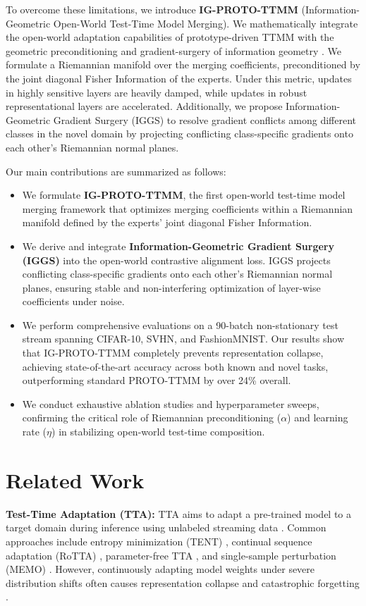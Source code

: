 \documentclass{article}
\theoremstyle{plain}
\theoremstyle{definition}
\theoremstyle{remark}
\begin{document}
To overcome these limitations, we introduce \textbf{IG-PROTO-TTMM} (Information-Geometric Open-World Test-Time Model Merging). We mathematically integrate the open-world adaptation capabilities of prototype-driven TTMM with the geometric preconditioning and gradient-surgery of information geometry \cite{amari2016methods}. We formulate a Riemannian manifold over the merging coefficients, preconditioned by the joint diagonal Fisher Information of the experts. Under this metric, updates in highly sensitive layers are heavily damped, while updates in robust representational layers are accelerated. Additionally, we propose Information-Geometric Gradient Surgery (IGGS) to resolve gradient conflicts among different classes in the novel domain by projecting conflicting class-specific gradients onto each other's Riemannian normal planes.

Our main contributions are summarized as follows:
\begin{itemize}
  \item We formulate \textbf{IG-PROTO-TTMM}, the first open-world test-time model merging framework that optimizes merging coefficients within a Riemannian manifold defined by the experts' joint diagonal Fisher Information.
  \item We derive and integrate \textbf{Information-Geometric Gradient Surgery (IGGS)} into the open-world contrastive alignment loss. IGGS projects conflicting class-specific gradients onto each other's Riemannian normal planes, ensuring stable and non-interfering optimization of layer-wise coefficients under noise.
  \item We perform comprehensive evaluations on a 90-batch non-stationary test stream spanning CIFAR-10, SVHN, and FashionMNIST. Our results show that IG-PROTO-TTMM completely prevents representation collapse, achieving state-of-the-art accuracy across both known and novel tasks, outperforming standard PROTO-TTMM by over 24\% overall.
  \item We conduct exhaustive ablation studies and hyperparameter sweeps, confirming the critical role of Riemannian preconditioning ($\alpha$) and learning rate ($\eta$) in stabilizing open-world test-time composition.
\end{itemize}

\section{Related Work}
\label{related}

\textbf{Test-Time Adaptation (TTA):} TTA aims to adapt a pre-trained model to a target domain during inference using unlabeled streaming data \cite{schneider2020improving}. Common approaches include entropy minimization (TENT) \cite{wang2020tent}, continual sequence adaptation (RoTTA) \cite{choi2022robust}, parameter-free TTA \cite{boudiaf2022parameter}, and single-sample perturbation (MEMO) \cite{zhang2022memo}. However, continuously adapting model weights under severe distribution shifts often causes representation collapse and catastrophic forgetting \cite{wang2022continual, zhao2023test}.
\end{document}
